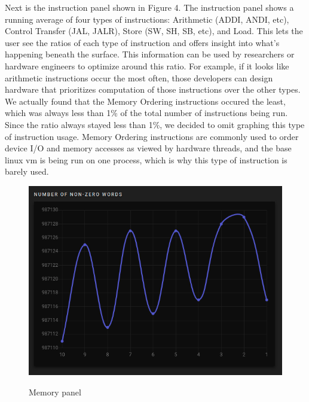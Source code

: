 \noindent

Next is the instruction panel shown in Figure 4. The instruction panel shows a running average of four types of instructions:
Arithmetic (ADDI, ANDI, etc), Control Transfer (JAL, JALR), Store (SW, SH, SB, etc), and Load. 
This lets the user see the ratios of each type of instruction and offers 
insight into what's happening beneath the surface. This information can be used by researchers or hardware engineers to
optimize around this ratio. For example, if it looks like arithmetic instructions occur the most often, those developers can design
hardware that prioritizes computation of those instructions over the other types. We actually found that the Memory Ordering 
instructions occured the least, which was always less than 1\% of the total number of instructions being run. Since the ratio
always stayed less than 1\%, we decided to omit graphing this type of instruction usage. Memory Ordering instructions are commonly
used to order device I/O and memory accesses as viewed by hardware threads, and the base linux vm is being run on one process,
which is why this type of instruction is barely used.

\begin{figure}[H]
  \includegraphics[scale=.4]{mem}
  \label{fig:mem}
  \caption{Memory panel}
  \centering
\end{figure}

\noindent

